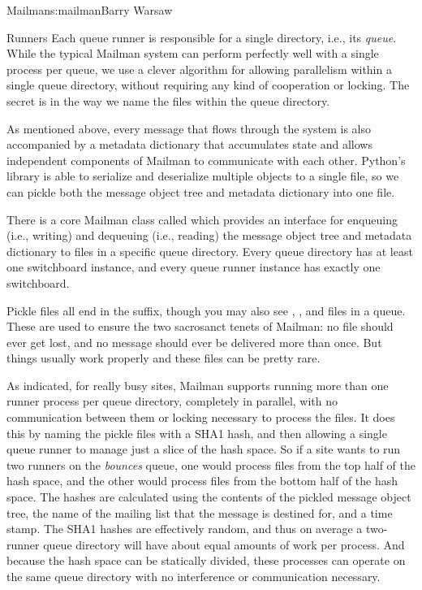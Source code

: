 \begin{aosachapter}{Mailman}{s:mailman}{Barry Warsaw}
\begin{aosasect1}{Runners}
Each queue runner is responsible for a single directory, i.e., its
\emph{queue}.  While the typical Mailman system can perform perfectly
well with a single process per queue, we use a clever algorithm for
allowing parallelism within a single queue directory, without
requiring any kind of cooperation or locking.  The secret is in the
way we name the files within the queue directory.

As mentioned above, every message that flows through the system is
also accompanied by a metadata dictionary that accumulates state and
allows independent components of Mailman to communicate with each
other.  Python's  library is able to serialize and
deserialize multiple objects to a single file, so we can pickle both
the message object tree and metadata dictionary into one file.

There is a core Mailman class called  which provides
an interface for enqueuing (i.e., writing) and dequeuing (i.e.,
reading) the message object tree and metadata dictionary to files in a
specific queue directory.  Every queue directory has at least one
switchboard instance, and every queue runner instance has exactly one
switchboard.

Pickle files all end in the  suffix, though you may also
see , , and  files in a queue.  These
are used to ensure the two sacrosanct tenets of Mailman: no file
should ever get lost, and no message should ever be delivered more
than once.  But things usually work properly and these files can be
pretty rare.

As indicated, for really busy sites, Mailman supports running more
than one runner process per queue directory, completely in parallel,
with no communication between them or locking necessary to process the
files.  It does this by naming the pickle files with a SHA1 hash, and
then allowing a single queue runner to manage just a slice of the hash
space.  So if a site wants to run two runners on the \emph{bounces}
queue, one would process files from the top half of the hash space,
and the other would process files from the bottom half of the hash
space.  The hashes are calculated using the contents of the pickled
message object tree, the name of the mailing list that the message is
destined for, and a time stamp.  The SHA1 hashes are effectively
random, and thus on average a two-runner queue directory will have
about equal amounts of work per process.  And because the hash space
can be statically divided, these processes can operate on the same
queue directory with no interference or communication necessary.


\end{aosasect1}
\end{aosachapter}
